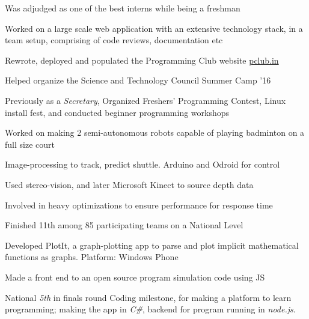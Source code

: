 \documentclass[a4paper]{deedy-resume} %
\begin{document}
\begin{minipage}[t]{0.66\textwidth}
  \begin{tightitemize}
  \item Was adjudged as one of the best interns while being a freshman
  \item Worked on a large scale web application with an extensive
    technology stack, in a team setup, comprising of code reviews,
    documentation etc
  \end{tightitemize}

  \sectionspace

  \runsubsection{}
  \begin{tightitemize}
  \item Rewrote, deployed and populated the Programming Club website \href{https://pclub.in}{pclub.in}
  \item Helped organize the Science and Technology Council Summer Camp
    '16
  \item Previously as a \textit{Secretary}, Organized Freshers'
    Programming Contest, Linux install fest, and conducted beginner
    programming workshops
  \end{tightitemize}

  \sectionspace

  \runsubsection{}
  \begin{tightitemize}
  \item Worked on making 2 semi-autonomous robots capable of playing badminton on a full size court
  \item Image-processing to track, predict shuttle. Arduino and Odroid for control
  \item Used stereo-vision, and later Microsoft Kinect to source depth data
  \item Involved in heavy optimizations to ensure performance for response time
  \item Finished 11th among 85 participating teams on a National Level
  \end{tightitemize}

  \sectionspace

  \runsubsection{}
  \begin{tightitemize}
  \item Developed PlotIt, a graph-plotting app to parse and plot
    implicit mathematical functions as graphs. Platform: Windows
    Phone
  \item Made a front end to an open source program simulation code
    using JS
  \item National \textit{5th} in finals round Coding milestone, for
    making a platform to learn programming; making the app in
    \textit{C\#}, backend for program running in \textit{node.js}.
  \end{tightitemize}


\end{minipage}
\end{document}
